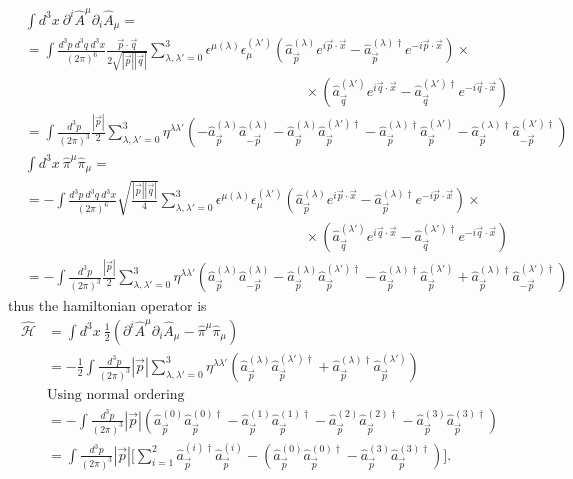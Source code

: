 \begin{align*}
    &\int d^3x\ \partial^i \hat{A}^\mu\partial_i \hat{A}_\mu=
    \\&=\int\frac{d^3p\ d^3q\ d^3x}{(2\pi)^6}\frac{\vec p\cdot\vec q}{2\sqrt{|\vec p||\vec q|}}\sum_{\lambda,\lambda'=0}^{3}\epsilon^{\mu(\lambda)}\epsilon_{\mu}^{(\lambda')}(\hat{a}_{\vec p}^{(\lambda)}e^{i\vec p\cdot\vec x}-\hat{a}_{\vec p}^{(\lambda)\dagger}e^{-i\vec p\cdot\vec x})\times\\&\qquad\qquad\qquad\qquad\qquad\qquad\qquad\qquad\qquad\qquad\times(\hat{a}_{\vec q}^{(\lambda')}e^{i\vec q\cdot\vec x}-\hat{a}_{\vec q}^{(\lambda')\dagger}e^{-i\vec q\cdot\vec x})\\
    &=\int\frac{d^3p}{(2\pi)^3}\frac{|\vec p|}{2}\sum_{\lambda,\lambda'=0}^{3}\eta^{\lambda\lambda'}(-\hat{a}_{\vec p}^{(\lambda)}\hat{a}_{-\vec p}^{(\lambda)}-\hat{a}_{\vec p}^{(\lambda)}\hat{a}_{\vec p}^{(\lambda')\dagger}-\hat{a}_{\vec p}^{(\lambda)\dagger}\hat{a}_{\vec p}^{(\lambda')}-\hat{a}_{\vec p}^{(\lambda)\dagger}\hat{a}_{-\vec p}^{(\lambda')\dagger})\\
    &\int d^3x\ \hat{\pi}^\mu\hat{\pi}_\mu=
    \\&=-\int\frac{d^3p\ d^3q\ d^3x}{(2\pi)^6}\sqrt{\frac{|\vec p||\vec q|}{4}}\sum_{\lambda,\lambda'=0}^{3}\epsilon^{\mu(\lambda)}\epsilon_{\mu}^{(\lambda')}(\hat{a}_{\vec p}^{(\lambda)}e^{i\vec p\cdot\vec x}-\hat{a}_{\vec p}^{(\lambda)\dagger}e^{-i\vec p\cdot\vec x})\times\\&\qquad\qquad\qquad\qquad\qquad\qquad\qquad\qquad\qquad\qquad\times(\hat{a}_{\vec q}^{(\lambda')}e^{i\vec q\cdot\vec x}-\hat{a}_{\vec q}^{(\lambda')\dagger}e^{-i\vec q\cdot\vec x})\\
    &=-\int\frac{d^3p}{(2\pi)^3}\frac{|\vec p|}{2}\sum_{\lambda,\lambda'=0}^{3}\eta^{\lambda\lambda'}(\hat{a}_{\vec p}^{(\lambda)}\hat{a}_{-\vec p}^{(\lambda)}-\hat{a}_{\vec p}^{(\lambda)}\hat{a}_{\vec p}^{(\lambda')\dagger}-\hat{a}_{\vec p}^{(\lambda)\dagger}\hat{a}_{\vec p}^{(\lambda')}+\hat{a}_{\vec p}^{(\lambda)\dagger}\hat{a}_{-\vec p}^{(\lambda')\dagger})
\end{align*}
thus the hamiltonian operator is
\begin{align*}
    \hat{\mathcal{H}} &=\int d^3x\ \frac{1}{2}(\partial^i \hat{A}^\mu\partial_i \hat{A}_\mu-\hat{\pi}^\mu\hat{\pi}_\mu)\\&=-\frac{1}{2}\int\frac{d^3p}{(2\pi)^3}|\vec p|\sum_{\lambda,\lambda'=0}^{3}\eta^{\lambda\lambda'}(\hat{a}_{\vec p}^{(\lambda)}\hat{a}_{\vec p}^{(\lambda')\dagger}+\hat{a}_{\vec p}^{(\lambda)\dagger}\hat{a}_{\vec p}^{(\lambda')})\\&\text{Using normal ordering}\\
    &=-\int\frac{d^3p}{(2\pi)^3}|\vec p|(\hat{a}_{\vec p}^{(0)}\hat{a}_{\vec p}^{(0)\dagger}-\hat{a}_{\vec p}^{(1)}\hat{a}_{\vec p}^{(1)\dagger}-\hat{a}_{\vec p}^{(2)}\hat{a}_{\vec p}^{(2)\dagger}-\hat{a}_{\vec p}^{(3)}\hat{a}_{\vec p}^{(3)\dagger})\\
    &=\int\frac{d^3p}{(2\pi)^3}|\vec p|\bigg[\sum_{i=1}^{2}\hat{a}_{\vec p}^{(i)\dagger}\hat{a}_{\vec p}^{(i)}-(\hat{a}_{\vec p}^{(0)}\hat{a}_{\vec p}^{(0)\dagger}-\hat{a}_{\vec p}^{(3)}\hat{a}_{\vec p}^{(3)\dagger})\bigg].
\end{align*}
